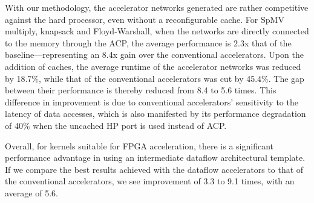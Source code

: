 \documentclass{sig-alternate}
\begin{document}
With our methodology, the accelerator networks generated 
are rather competitive against the hard processor, even
without a reconfigurable cache. For SpMV multiply, knapsack and Floyd-Warshall, when the networks are directly connected to the memory through the ACP, 
the average performance is 2.3x that of the baseline---representing
an 8.4x gain over the conventional accelerators.
Upon the addition of caches,  
the average runtime of the accelerator networks was reduced by 18.7\%,  while that of the conventional
accelerators was cut by 45.4\%. The gap between their performance is thereby reduced from 8.4 to 5.6 times. This difference in improvement is due to conventional accelerators' sensitivity to the latency of data accesses, which is also manifested by its performance degradation of 40\% when the uncached HP port is used instead of ACP. 

Overall, for kernels suitable for FPGA acceleration, there is a significant performance advantage in using
an intermediate dataflow architectural template. If we compare the best results achieved with the
dataflow accelerators to that of the conventional accelerators, we see improvement
of 3.3 to 9.1 times, with an average of 5.6. 





\end{document}
